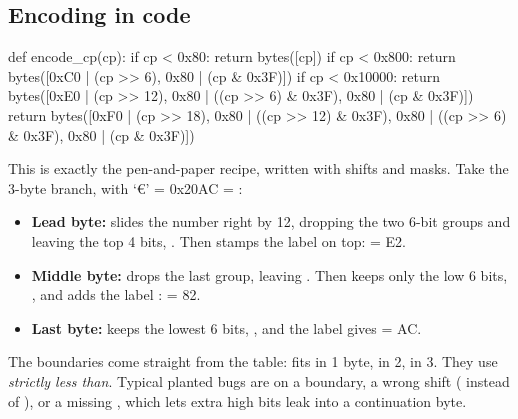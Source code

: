 \documentclass[10pt,a4paper]{article}
\begin{document}
\subsection{Encoding in code}
\begin{pycode}
def encode_cp(cp):
    if cp < 0x80:
        return bytes([cp])
    if cp < 0x800:
        return bytes([0xC0 | (cp >> 6),
                      0x80 | (cp & 0x3F)])
    if cp < 0x10000:
        return bytes([0xE0 | (cp >> 12),
                      0x80 | ((cp >> 6) & 0x3F),
                      0x80 | (cp & 0x3F)])
    return bytes([0xF0 | (cp >> 18),
                  0x80 | ((cp >> 12) & 0x3F),
                  0x80 | ((cp >> 6) & 0x3F),
                  0x80 | (cp & 0x3F)])
\end{pycode}
This is exactly the pen-and-paper recipe, written with shifts and masks. Take the 3-byte branch, with ‘€’ = 0x20AC = :
\begin{itemize}
\item \textbf{Lead byte:}  slides the number right by 12, dropping the two 6-bit groups and leaving the top 4 bits, . Then  stamps the label  on top:  = E2.
\item \textbf{Middle byte:}  drops the last group, leaving . Then  keeps only the low 6 bits, , and  adds the label :  = 82.
\item \textbf{Last byte:}  keeps the lowest 6 bits, , and the label gives  = AC.
\end{itemize}
The  boundaries come straight from the table:  fits in 1 byte,  in 2,  in 3. They use \emph{strictly less than}. Typical planted bugs are \code{\textless{}\allowbreak{}=\allowbreak{}} on a boundary, a wrong shift ( instead of ), or a missing , which lets extra high bits leak into a continuation byte.
\end{document}
